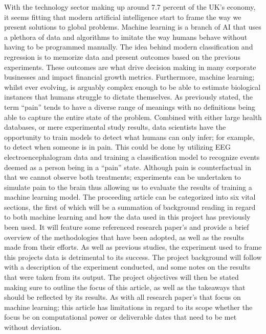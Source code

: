 \documentclass[12pt]{article}
\begin{document}
With the technology sector making up around 7.7 percent of the UK’s economy, it seems fitting that modern artificial intelligence start to frame the way we present solutions to global problems. Machine learning is a branch of AI that uses a plethora of data and algorithms to imitate the way humans behave without having to be programmed manually. The idea behind modern classification and regression is to memorize data and present outcomes based on the previous experiments. These outcomes are what drive decision making in many corporate businesses and impact financial growth metrics. Furthermore, machine learning; whilst ever evolving, is arguably complex enough to be able to estimate biological instances that humans struggle to dictate themselves. 
As previously stated, the term “pain” tends to have a diverse range of meanings with no definitions being able to capture the entire state of the problem. Combined with either large health databases, or mere experimental study results, data scientists have the opportunity to train models to detect what humans can only infer; for example, to detect when someone is in pain. This could be done by utilizing EEG electroencephalogram data and training a classification model to recognize events deemed as a person being in a “pain” state. Although pain is counterfactual in that we cannot observe both treatments; experiments can be undertaken to simulate pain to the brain thus allowing us to evaluate the results of training a machine learning model. 
The proceeding article can be categorized into six vital sections, the first of which will be a summation of background reading in regard to both machine learning and how the data used in this project has previously been used. It will feature some referenced research paper’s and provide a brief overview of the methodologies that have been adopted, as well as the results made from their efforts. As well as previous studies, the experiment used to frame this projects data is detrimental to its success. The project background will follow with a description of the experiment conducted, and some notes on the results that were taken from its output. The project objectives will then be stated making sure to outline the focus of this article, as well as the takeaways that should be reflected by its results. As with all research paper’s that focus on machine learning; this article has limitations in regard to its scope whether the focus be on computational power or deliverable dates that need to be met without deviation. 
\end{document}
